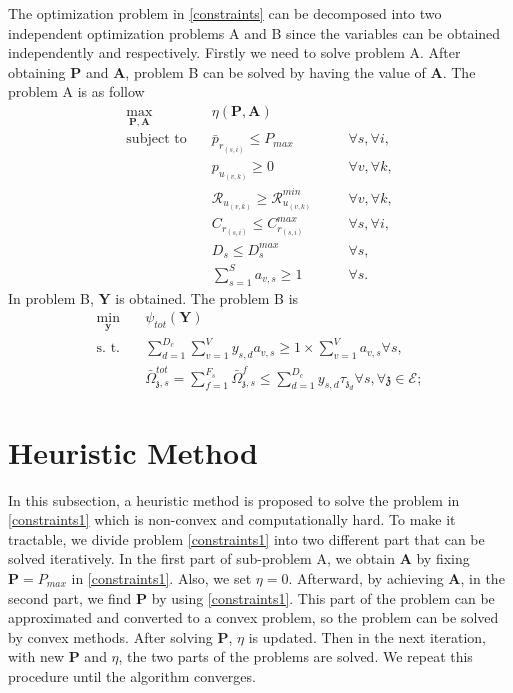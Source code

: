 \documentclass[conference]{IEEEtran}
\begin{document}
The optimization problem in \eqref{constraints} can be decomposed into two independent optimization problems A and B since the variables can be obtained independently and respectively. Firstly we need to solve problem A. After obtaining $\boldsymbol{P}$ and $ \boldsymbol{A}$, problem B can be solved by having the value of $ \boldsymbol{A}$. 
The problem A is as follow
\begin{subequations}
\begin{alignat}{4}
\max\limits_{\boldsymbol{P}, \boldsymbol{A} }   \quad &   \eta(\boldsymbol{P},\boldsymbol{A})\\
\text{subject to} \quad  & \bar{p}_{r_{(s,i)}} \leq P_{max} && \quad \forall s, \forall i,   \\
&p_{u_{(v,k)}}  \geq 0  &&\quad \forall v, \forall k, \\
&\mathcal{R}_{u_{(v,k)}} \geq  \mathcal{R}_{u_{(v,k)}}^{min} && \quad \forall v, \forall k, \\
&C_{r_{(s,i)}} \leq C_{r_{(s,i)}}^{max}  &&\quad \forall s, \forall i,\label{cc14} \\
&D_{s} \leq D_{s}^{max}  &&\quad \forall s, \label{cc15} \\
& \textstyle  \sum_{s=1}^{S}a_{v,s} \geq 1 &&\quad \forall s.
\end{alignat}
\label{constraints1}
\end{subequations}
In problem B, $ \boldsymbol{Y}$ is obtained. The problem B is
\begin{subequations}
\begin{alignat}{4}
\min\limits_{\boldsymbol{y} }   \quad &   \psi_{tot}(\boldsymbol{Y})\\
\text{s. t.} \quad & \textstyle \sum_{d=1}^{D_c}\sum_{v=1}^{V}y_{s,d}a_{v,s} \geq 1\times\sum_{v=1}^{V}a_{v,s} \forall s, \\
 &\textstyle  \bar{\Omega}_{\mathfrak{z},s}^{tot} = \sum_{f=1}^{F_s}\bar{\Omega}_{\mathfrak{z},s}^f \leq  \sum_{d=1}^{D_c} y_{s,d} \tau_{\mathfrak{z}_d}
\forall s, \forall \mathfrak{z}\in \mathcal{E};  \label{eqomega}
\end{alignat}
\label{constraints2}
\end{subequations}
\section{Heuristic Method}\label{proposedmethod}
In this subsection, a heuristic  method is proposed to solve the problem in \eqref{constraints1} which is non-convex and computationally hard. To make it tractable, we divide problem \eqref{constraints1} into
two different part that can be solved iteratively.
In the first part of sub-problem A, we obtain $\boldsymbol{A}$ by fixing $\boldsymbol{P} = P_{max}$ in \eqref{constraints1}. Also, we set $\eta = 0$. Afterward, by achieving $\boldsymbol{A}$, in the second part, we find $\boldsymbol{P}$ by using \eqref{constraints1}. This part of the problem can be approximated and converted to a convex problem, so the problem can be solved by convex methods. After solving $\boldsymbol{P}$, $\eta$ is updated. Then in the next iteration, with new $\boldsymbol{P}$
and $\eta$, the two parts of the problems are solved. We repeat this procedure until the algorithm  converges.
\end{document}
